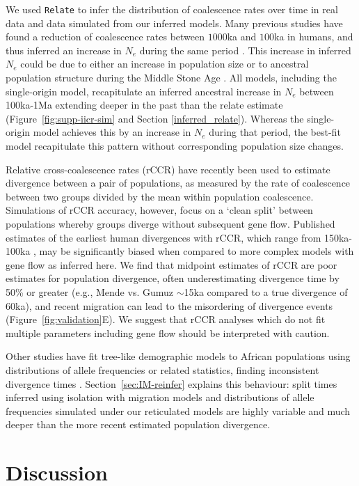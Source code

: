 \documentclass[]{article}
\begin{document}
We used \texttt{Relate} \citep{Speidel2019-nj} to infer the distribution of
coalescence rates over time in real data and data simulated from our inferred
models. Many previous studies have found a reduction of coalescence rates
between $1000$ka and $100$ka in humans, and thus inferred an increase in $N_e$
during the same period \citep{Li2011-le}.  This increase in inferred $N_e$
could be due to either an increase in population size or to ancestral
population structure during the Middle Stone Age \citep{Mazet2016-wn}.  All
models, including the single-origin model, recapitulate an inferred ancestral
increase in $N_e$ between 100ka-1Ma extending deeper in the past than the
relate estimate (Figure~\ref{fig:supp-iicr-sim} and Section
\ref{inferred_relate}). Whereas the single-origin model achieves this by an
increase in $N_e$ during that period, the best-fit model recapitulate this
pattern without corresponding population size changes.     

Relative cross-coalescence rates (rCCR) have recently been used to estimate
divergence between a pair of populations, as measured by the rate of
coalescence between two groups divided by the mean within population
coalescence. Simulations of rCCR accuracy, however, focus on a ‘clean split’
between populations whereby groups diverge without subsequent gene flow.
Published estimates of the earliest human divergences with rCCR, which range
from 150ka-100ka \citep{Bergstrom2021-iw}, may be significantly biased when
compared to more complex models with gene flow as inferred here. We find that
midpoint estimates of rCCR are poor estimates for population divergence, often
underestimating divergence time by 50\% or greater (e.g., Mende vs. Gumuz
$\sim$15ka compared to a true divergence of 60ka), and recent migration can
lead to the misordering of divergence events (Figure~\ref{fig:validation}E). We
suggest that rCCR analyses which do not fit multiple parameters including gene
flow should be interpreted with caution.

Other studies have fit tree-like demographic models to African populations
using distributions of allele frequencies or related statistics, finding
inconsistent divergence times \cite{Henn2018-rf,Bergstrom2021-iw}.
Section~\ref{sec:IM-reinfer} explains this behaviour: split times inferred
using isolation with migration models and distributions of allele frequencies
simulated under our reticulated models are highly variable and much deeper than
the more recent estimated population divergence. 

\section*{Discussion}
\end{document}

